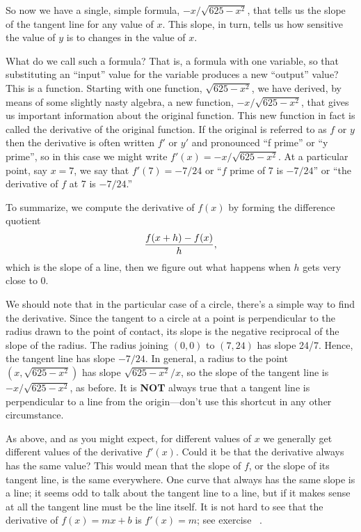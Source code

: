 So now we have a single, simple formula, ${-x/ \sqrt{625-x^2}}$,
that tells us the slope of the tangent line for any value of
$x$. This slope, in turn, tells us how sensitive the value of $y$ is
to changes in the value of $x$. 

What do we call such a formula? That is, a formula with one variable,
so that substituting an ``input'' value for the variable produces a
new ``output'' value? This is a function. Starting with one function,
$\sqrt{625-x^2}$, we have derived, by means of some slightly nasty
algebra, a new function, ${-x/ \sqrt{625-x^2}}$, that gives us
important information about the original function. This new function
in fact is called the {\dfont derivative} of the
original function. If the original is referred to as $f$ or $y$ then
the derivative is often written $f'$ or $y'$ and pronounced ``f
prime'' or ``y prime'', so in this case we might write $f'(x)=-x/
\sqrt{625-x^2}$. At a particular point, say $x=7$, we say that
$f'(7)=-7/24$ or ``$f$ prime of 7 is $-7/24$'' or ``the derivative of
$f$ at 7 is $-7/24$.''

To summarize, we compute the derivative of $f(x)$ by forming the
difference quotient
$$
{f(x+ h)-f(x)\over  h},
$$
which is the slope of a line, then we figure out what happens when
$h$ gets very close to 0. 


We should note that in 
the particular case of a circle, there's a simple way to find the
derivative.  Since the tangent to a circle at a point is perpendicular to
the radius drawn to the point of contact, its slope is the negative
reciprocal of the slope of the radius.  The radius joining $(0,0)$ to
$(7,24)$ has slope 24/7.  Hence, the tangent line has slope
$-7/24$. In general, a radius to the point $(x,\sqrt{625-x^2})$ has
slope $\sqrt{625-x^2}/x$, so the slope of the tangent line is
${-x/ \sqrt{625-x^2}}$, as before. It is {\bf NOT} always true that a
tangent line is perpendicular to a line from the origin---don't use
this shortcut in any other circumstance. 

As above, and as you might expect, for different values of $x$ we
generally get different values of the derivative $f'(x)$. Could it be
that the derivative always has the same value? This would mean that
the slope of $f$, or the slope of its tangent line, is the same
everywhere. One curve that always has the same slope is a line; it
seems odd to talk about the tangent line to a line, but if it makes
sense at all the tangent line must be the line itself. It is not hard
to see that the derivative of $f(x)=mx+b$ is $f'(x)=m$; see
exercise~ .









